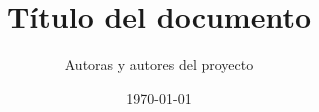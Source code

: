\usepackage{iftex}
\ifPDFTeX
  \usepackage[T1]{fontenc}
  \usepackage{lmodern}
\fi
\usepackage[spanish]{babel}
\usepackage{csquotes}
\usepackage{amsmath}
\usepackage{amssymb}
\usepackage{amsthm}
\usepackage{graphicx}
\usepackage{booktabs}
\usepackage[backend=biber,style=authoryear]{biblatex}
\usepackage{hyperref}
\hypersetup{hidelinks}
\title{Título del documento}
\author{Autoras y autores del proyecto}
\date{\today}

